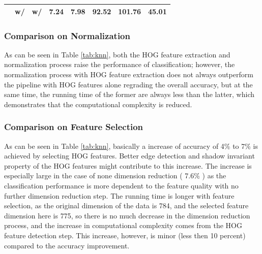 \documentclass[12pt]{article}
\begin{document}
\begin{table}[]
{\begin{tabular}{@{}cccccccc@{}}
                                                                                                    & w/                             & w/                                                                     & 7.24                                                                                 & 7.98   & 92.52      & 101.76   & 45.01                                                                                       \\ \bottomrule
\end{tabular}
}
\end{table}

\subsubsection{Comparison on Normalization}
As can be seen in Table \ref{tab:knn}, both the HOG feature extraction and normalization process raise the performance of classification; however, the normalization process with HOG feature extraction does not always outperform the pipeline with HOG features alone regrading the overall accuracy, but at the same time, the running time of the former are always less than the latter, which demonstrates that the computational complexity is reduced. 

\subsubsection{Comparison on Feature Selection}
As can be seen in Table \ref{tab:knn}, basically a increase of accuracy of 4\% to 7\% is achieved by selecting HOG features. Better edge detection and shadow invariant property of the HOG features might contribute to this increase. The increase is especially large in the case of none dimension reduction ( 7.6\% ) as the classification performance is more dependent to the feature quality with no further dimension reduction step.
The running time is longer with feature selection, as the original dimension of the data is 784, and the selected feature dimension here is 775, so there is no much decrease in the dimension reduction process, and the increase in computational complexity comes from the HOG feature detection step. This increase, however, is minor (less then 10 percent) compared to the accuracy improvement.
\end{document}
